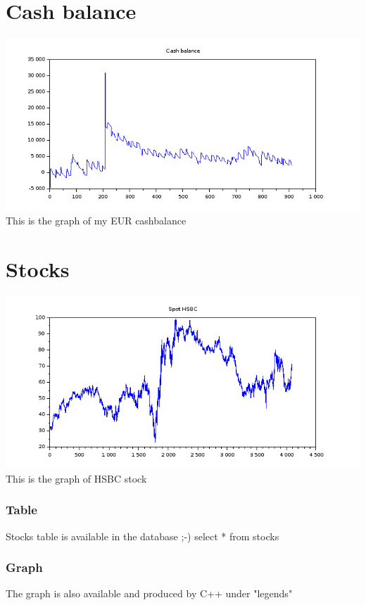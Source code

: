 \documentclass[8pt]{article} %
\begin{document}
\section{Cash balance}
\includegraphics[scale=0.6]{Scilab-cashBalance.png}
This is the graph of my EUR cashbalance 

\section{Stocks}
\includegraphics[scale=0.6]{Scilab-stocks.png}
This is the graph of HSBC stock 

\subsubsection{Table}
Stocks table is available in the database ;-)
select * from stocks
%
\subsubsection{Graph}
The graph is also available and produced by C++ under "legends"
%
%
\end{document}
